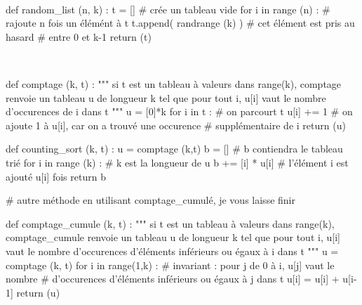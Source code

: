 \question\

\begin{python}
def random_list (n, k) :
    t = [] # crée un tableau vide
    for i in range (n) : # rajoute n fois un élémént à t
        t.append( randrange (k) )   # cet élément est pris au hasard
                                    # entre 0 et k-1
    return (t)
\end{python}

\question\

\begin{python}

def comptage (k, t) :
    """ si t est un tableau à valeurs dans range(k), comptage renvoie
    un tableau u de longueur k tel que pour tout i, u[i] vaut le nombre
    d'occurences de i dans t """
    u = [0]*k
    for i in t : # on parcourt t
        u[i] += 1 # on ajoute 1 à u[i], car on a trouvé une occurence
                 # supplémentaire de i
    return (u)

def counting_sort (k, t) :
    u = comptage (k,t)
    b = [] # b contiendra le tableau trié
    for i in range (k) : # k est la longueur de u
        b += [i] * u[i] # l'élément i est ajouté u[i] fois
    return b

# autre méthode en utilisant comptage_cumulé, je vous laisse finir

def comptage_cumule (k, t) :
    """ si t est un tableau à valeurs dans range(k), comptage_cumule renvoie
    un tableau u de longueur k tel que pour tout i, u[i] vaut le nombre
    d'occurences d'éléments inférieurs ou égaux à i dans t """
    u = comptage (k, t)
    for i in range(1,k) : # invariant : pour j de 0 à i, u[j] vaut le nombre
                # d'occurences d'éléments inférieurs ou égaux à j dans t
        u[i] = u[i] + u[i-1] 
    return (u)

\end{python}

\question\

